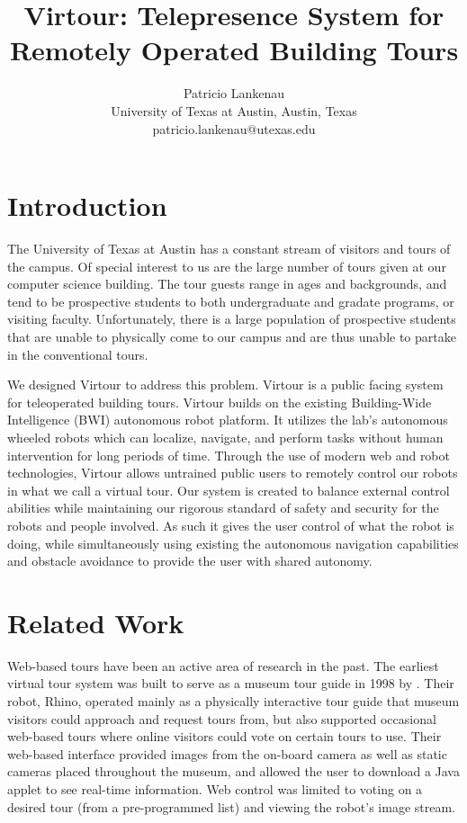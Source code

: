 \documentclass[
  oneside,
  11pt, a4paper,
  footinclude=true,
  headinclude=true,
  cleardoublepage=empty
]{article}
\title{Virtour: Telepresence System for Remotely Operated Building Tours}
\author{Patricio Lankenau\\
        University of Texas at Austin, Austin, Texas\\
        patricio.lankenau@utexas.edu\\}
\date{}
\begin{document}
\maketitle

\tableofcontents
\newpage

\section{Introduction}

The University of Texas at Austin has a constant stream of visitors and tours
of the campus. Of special interest to us are the large number of tours given at
our computer science building. The tour guests range in ages and backgrounds,
and tend to be prospective students to both undergraduate and gradate programs,
or visiting faculty. Unfortunately, there is a large population of prospective
students that are unable to physically come to our campus and are thus unable
to partake in the conventional tours.

We designed Virtour to address this problem. Virtour is a public facing system
for teleoperated building tours. Virtour builds on the existing Building-Wide
Intelligence (BWI) autonomous robot platform. It utilizes the lab's autonomous
wheeled robots which can localize, navigate, and perform tasks without human
intervention for long periods of time. Through the use of modern web and robot
technologies, Virtour allows untrained public users to remotely control our
robots in what we call a virtual tour. Our system is created to balance
external control abilities while maintaining our rigorous standard of safety
and security for the robots and people involved. As such it gives the user
control of what the robot is doing, while simultaneously using existing the
autonomous navigation capabilities and obstacle avoidance to provide the user
with shared autonomy.

\section{Related Work}

Web-based tours have been an active area of research in the past. The earliest
virtual tour system was built to serve as a museum tour guide in 1998 by
\cite{burgard1998}. Their robot, Rhino, operated mainly as a physically
interactive tour guide that museum visitors could approach and request tours
from, but also supported occasional web-based tours where online visitors could
vote on certain tours to use. Their web-based interface provided images from
the on-board camera as well as static cameras placed throughout the museum, and
allowed the user to download a Java applet to see real-time information. Web
control was limited to voting on a desired tour (from a pre-programmed list)
and viewing the robot's image stream.
\end{document}
